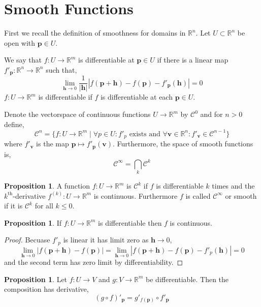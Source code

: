 \documentclass[12pt]{extarticle}
\newcommand{\R}{\mathbb{R}}
\theoremstyle{definition}
\newtheorem{proposition}[theorem]{Proposition}
\newenvironment{definition}[1][Definition:]{\begin{trivlist}
\item[\hskip \labelsep {\bfseries #1}]}{\end{trivlist}}
\renewcommand{\bf}[1]{\mathbf{#1}}
\newcommand{\C}[1]{\mathcal{C}^{#1}}
\begin{document}
\section{Smooth Functions}

First we recall the definition of smoothness for domains in $\R^n$. Let $U \subset \R^n$ be open with $\bf{p} \in U$.

\begin{definition}
We say that $f : U \to \R^m$ is differentiable at $\bf{p} \in U$ if there is a linear map $f'_{\bf{p}} : \R^n \to \R^n$ such that,
\[ \lim_{\bf{h} \to 0} \frac{1}{|\bf{h}|} \left| f(\bf{p} + \bf{h}) - f(\bf{p}) - f'_{\bf{p}} (\bf{h})  \right| = 0 \] 
$f : U \to \R^m$ is differentiable if $f$ is differentiable at each $\bf{p} \in U$.
\end{definition}

\begin{definition}
Denote the vectorspace of continuous functions $U \to \R^m$ by $\C{0}$ and for $n > 0$ define, 
\[ \C{n} = \{ f : U \to \R^m \mid \forall p \in U : f'_p \text{ exists and } \forall \bf{v} \in \R^n : f'_\bf{v} \in \C{n-1} \} \] 
where $f'_\bf{v}$ is the map $\bf{p} \mapsto f'_{\bf{p}}(\bf{v})$. Furthermore, the space of smooth functions is,
\[ \C{\infty} = \bigcap_{k} \C{k} \] 
\end{definition}

\begin{proposition}
A function $f : U \to \R^m$ is $\C{k}$ if $f$ is differentiable $k$ times and the $k^{\mathrm{th}}$-derivative $f^{(k)} : U \to \R^m$ is continuous. Furthermore $f$ is called $\C{\infty}$ or smooth if it is $\C{k}$ for all $k \le 0$.
\end{proposition}

\begin{proposition}
If $f : U \to \R^m$ is differentiable then $f$ is continuous. 
\end{proposition}

\begin{proof}
Becuase $f'_p$ is linear it has limit zero as $\bf{h} \to 0$,
\[ \lim_{\bf{h} \to 0} | f(\bf{p} + \bf{h}) - f(\bf{p})| = \lim_{\bf{h} \to 0} \left| f(\bf{p} + \bf{h}) - f(\bf{p}) - f'_p(\bf{h})  \right| = 0 \]
and the second term has zero limit by differentiability.
\end{proof}

\begin{proposition}
Let $f : U \to V$ and $g : V \to \R^m$ be differentiable. Then the composition has derivative, 
\[ (g \circ f)'_{\bf{p}} = g'_{f(\bf{p})} \circ f'_{\bf{p}} \]
\end{proposition}
\end{document}
